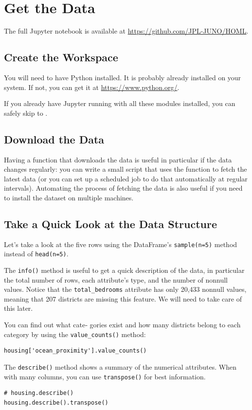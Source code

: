 \section{Get the Data}
The full Jupyter notebook is available at \url{https://github.com/JPL-JUNO/HOML}.
\subsection{Create the Workspace}
You will need to have Python installed. It is probably already installed on your
system. If not, you can get it at \url{https://www.python.org/}.

If you already have Jupyter running with all these modules installed,
you can safely skip to .
\subsection{Download the Data\label{Download the Data}}

Having a function that downloads the data is useful in particular if the
data changes regularly: you can write a small script that uses the function to fetch the
latest data (or you can set up a scheduled job to do that automatically at regular intervals). Automating the process of fetching the data is also useful if you need to install
the dataset on multiple machines.

\subsection{Take a Quick Look at the Data Structure}
Let’s take a look at the five rows using the DataFrame’s \verb|sample(n=5)| method instead of \verb|head(n=5)|.

The \verb|info()| method is useful to get a quick description of the data, in particular the
total number of rows, each attribute’s type, and the number of nonnull values. Notice that the 
\verb|total_bedrooms| attribute has only 20,433 nonnull values, meaning that 207 districts are missing
this feature. We will need to take care of this later.

You can find out what cate‐
gories exist and how many districts belong to each category by using the
\verb|value_counts()| method:

\begin{verbatim}
housing['ocean_proximity'].value_counts()
\end{verbatim}

The \verb|describe()| method shows a summary of the
numerical attributes. When with many columns, you can use \verb|transpose()| for best information.
\begin{verbatim}
# housing.describe()
housing.describe().transpose()
\end{verbatim}

